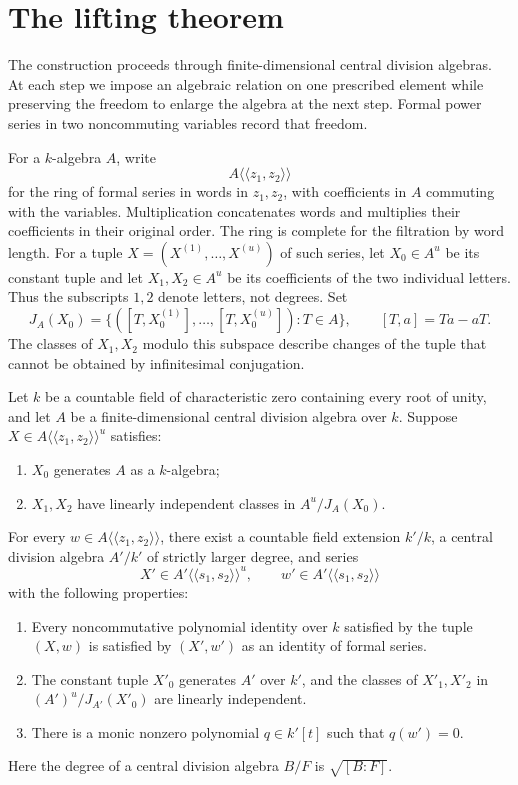 \section{The lifting theorem}\label{sec:lifting}

The construction proceeds through finite-dimensional central division
algebras. At each step we impose an algebraic relation on one prescribed
element while preserving the freedom to enlarge the algebra at the next step.
Formal power series in two noncommuting variables record that freedom.

For a $k$-algebra $A$, write
\[
 A\langle\!\langle z_1,z_2\rangle\!\rangle
\]
for the ring of formal series in words in $z_1,z_2$, with coefficients
in $A$ commuting with the variables. Multiplication concatenates words
and multiplies their coefficients in their original order. The ring is
complete for the filtration by word length. For a tuple
$X=(X^{(1)},\ldots,X^{(u)})$ of such series, let $X_0\in A^u$ be its
constant tuple and let $X_1,X_2\in A^u$ be its coefficients of the two
individual letters. Thus the subscripts $1,2$ denote letters, not degrees.
Set
\begin{equation}\label{eq:inner-tangent}
 J_A(X_0)=\{([T,X_0^{(1)}],\ldots,[T,X_0^{(u)}]):T\in A\},
 \qquad [T,a]=Ta-aT.
\end{equation}
The classes of $X_1,X_2$ modulo this subspace describe changes of the tuple
that cannot be obtained by infinitesimal conjugation.

\begin{theorem}\label{thm:lifting}
Let $k$ be a countable field of characteristic zero containing every root
of unity, and let $A$ be a finite-dimensional central division algebra
over $k$. Suppose
$X\in A\langle\!\langle z_1,z_2\rangle\!\rangle^u$ satisfies:
\begin{enumerate}[label=\textup{(\roman*)}]
\item $X_0$ generates $A$ as a $k$-algebra;
\item $X_1,X_2$ have linearly independent classes in $A^u/J_A(X_0)$.
\end{enumerate}
For every $w\in A\langle\!\langle z_1,z_2\rangle\!\rangle$, there exist
a countable field extension $k'/k$, a central division algebra $A'/k'$ of
strictly larger degree, and series
\[
 X'\in A'\langle\!\langle s_1,s_2\rangle\!\rangle^u,
 \qquad w'\in A'\langle\!\langle s_1,s_2\rangle\!\rangle
\]
with the following properties:
\begin{enumerate}[label=\textup{(\alph*)}]
\item Every noncommutative polynomial identity over $k$ satisfied by the
tuple $(X,w)$ is satisfied by $(X',w')$ as an identity of formal series.
\item The constant tuple $X'_0$ generates $A'$ over $k'$, and the classes
of $X'_1,X'_2$ in $(A')^u/J_{A'}(X'_0)$ are linearly independent.
\item There is a monic nonzero polynomial $q\in k'[t]$ such that $q(w')=0$.
\end{enumerate}
Here the degree of a central division algebra $B/F$ is $\sqrt{[B:F]}$.
\end{theorem}

